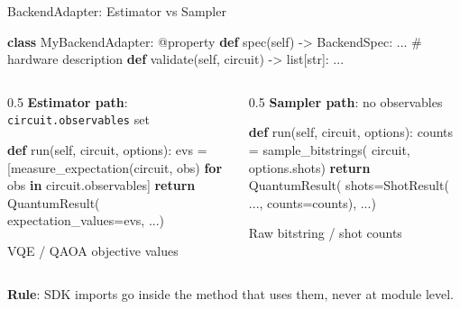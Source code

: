 \documentclass[
  ignorenonframetext,
  aspectratio=169,
]{beamer}
\newenvironment{Shaded}{\begin{snugshade}}{\end{snugshade}}
\newcommand{\AttributeTok}[1]{\textcolor[rgb]{0.16,0.50,0.73}{#1}}
\newcommand{\BuiltInTok}[1]{\textcolor[rgb]{0.50,0.55,0.55}{#1}}
\newcommand{\CommentTok}[1]{\textcolor[rgb]{0.48,0.49,0.49}{#1}}
\newcommand{\ControlFlowTok}[1]{\textcolor[rgb]{0.99,0.74,0.29}{\textbf{#1}}}
\newcommand{\KeywordTok}[1]{\textcolor[rgb]{0.81,0.81,0.76}{\textbf{#1}}}
\newcommand{\NormalTok}[1]{\textcolor[rgb]{0.81,0.81,0.76}{#1}}
\newcommand{\OperatorTok}[1]{\textcolor[rgb]{0.81,0.81,0.76}{#1}}
\newcommand{\VariableTok}[1]{\textcolor[rgb]{0.15,0.68,0.68}{#1}}
\begin{document}
\begin{frame}[fragile]{BackendAdapter: Estimator vs Sampler}
\label{backendadapter-estimator-vs-sampler}
\footnotesize

\begin{Shaded}
\begin{Highlighting}[]
\KeywordTok{class}\NormalTok{ MyBackendAdapter:}
    \AttributeTok{@property}
    \KeywordTok{def}\NormalTok{ spec(}\VariableTok{self}\NormalTok{) }\OperatorTok{{-}\textgreater{}}\NormalTok{ BackendSpec: ...    }\CommentTok{\# hardware description}
    \KeywordTok{def}\NormalTok{ validate(}\VariableTok{self}\NormalTok{, circuit) }\OperatorTok{{-}\textgreater{}} \BuiltInTok{list}\NormalTok{[}\BuiltInTok{str}\NormalTok{]: ...}
\end{Highlighting}
\end{Shaded}

\begin{columns}[T]
\begin{column}{0.5\textwidth}
\textbf{Estimator path}: \texttt{circuit.observables} set

\begin{Shaded}
\begin{Highlighting}[]
\KeywordTok{def}\NormalTok{ run(}\VariableTok{self}\NormalTok{, circuit, options):}
\NormalTok{    evs }\OperatorTok{=}\NormalTok{ [measure\_expectation(circuit, obs)}
           \ControlFlowTok{for}\NormalTok{ obs }\KeywordTok{in}\NormalTok{ circuit.observables]}
    \ControlFlowTok{return}\NormalTok{ QuantumResult(}
\NormalTok{        expectation\_values}\OperatorTok{=}\NormalTok{evs, ...)}
\end{Highlighting}
\end{Shaded}

VQE / QAOA objective values
\end{column}

\begin{column}{0.5\textwidth}
\textbf{Sampler path}: no observables

\begin{Shaded}
\begin{Highlighting}[]
\KeywordTok{def}\NormalTok{ run(}\VariableTok{self}\NormalTok{, circuit, options):}
\NormalTok{    counts }\OperatorTok{=}\NormalTok{ sample\_bitstrings(}
\NormalTok{        circuit, options.shots)}
    \ControlFlowTok{return}\NormalTok{ QuantumResult(}
\NormalTok{        shots}\OperatorTok{=}\NormalTok{ShotResult(}
\NormalTok{            ..., counts}\OperatorTok{=}\NormalTok{counts), ...)}
\end{Highlighting}
\end{Shaded}

Raw bitstring / shot counts
\end{column}
\end{columns}

\normalsize

\textbf{Rule}: SDK imports go inside the method that uses them, never at
module level.
\end{frame}
\end{document}
